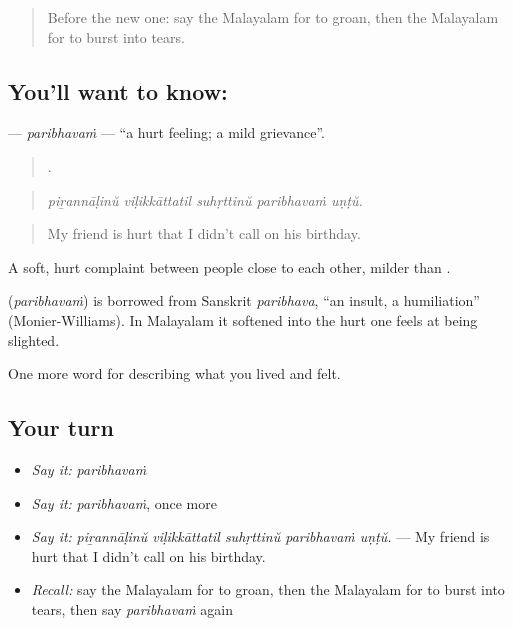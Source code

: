 \label{lesson:ML-C525-paribhavam}



\begin{quote}
Before the new one: say the Malayalam for to groan, then the Malayalam for to burst into tears.
\end{quote}

\subsection*{You'll want to know: }
\textbf{} — \emph{paribhavaṁ} — \textquotedblleft{}a hurt feeling; a mild grievance\textquotedblright{}.

\begin{quote}
    .
\end{quote}

\begin{quote}
\emph{piṟannāḷinŭ viḷikkāttatil suhṛttinŭ paribhavaṁ uṇṭŭ.}
\end{quote}

\begin{quote}
My friend is hurt that I didn't call on his birthday.
\end{quote}

A soft, hurt complaint between people close to each other, milder than .

\begin{cousinweb}
\textbf{} (\emph{paribhavaṁ}) is borrowed from Sanskrit \emph{paribhava}, \textquotedblleft{}an insult, a humiliation\textquotedblright{} (Monier-Williams). In Malayalam it softened into the hurt one feels at being slighted.
\end{cousinweb}

\begin{grammarlens}[title={What you've built}]
One more word for describing what you lived and felt.
\end{grammarlens}

\subsection*{Your turn}
\begin{itemize}
\raggedright
  \item \emph{Say it:} \emph{paribhavaṁ}
  \item \emph{Say it:} \emph{paribhavaṁ}, once more
  \item \emph{Say it:} \emph{piṟannāḷinŭ viḷikkāttatil suhṛttinŭ paribhavaṁ uṇṭŭ.} — My friend is hurt that I didn't call on his birthday.
  \item \emph{Recall:} say the Malayalam for to groan, then the Malayalam for to burst into tears, then say \emph{paribhavaṁ} again
\end{itemize}

